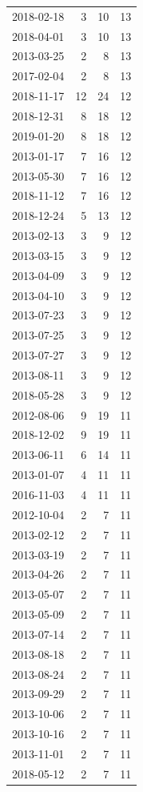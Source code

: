 \begin{tabular}{lrrr}
2018-02-18 & 3 & 10 & 13 \\
2018-04-01 & 3 & 10 & 13 \\
2013-03-25 & 2 & 8 & 13 \\
2017-02-04 & 2 & 8 & 13 \\
2018-11-17 & 12 & 24 & 12 \\
2018-12-31 & 8 & 18 & 12 \\
2019-01-20 & 8 & 18 & 12 \\
2013-01-17 & 7 & 16 & 12 \\
2013-05-30 & 7 & 16 & 12 \\
2018-11-12 & 7 & 16 & 12 \\
2018-12-24 & 5 & 13 & 12 \\
2013-02-13 & 3 & 9 & 12 \\
2013-03-15 & 3 & 9 & 12 \\
2013-04-09 & 3 & 9 & 12 \\
2013-04-10 & 3 & 9 & 12 \\
2013-07-23 & 3 & 9 & 12 \\
2013-07-25 & 3 & 9 & 12 \\
2013-07-27 & 3 & 9 & 12 \\
2013-08-11 & 3 & 9 & 12 \\
2018-05-28 & 3 & 9 & 12 \\
2012-08-06 & 9 & 19 & 11 \\
2018-12-02 & 9 & 19 & 11 \\
2013-06-11 & 6 & 14 & 11 \\
2013-01-07 & 4 & 11 & 11 \\
2016-11-03 & 4 & 11 & 11 \\
2012-10-04 & 2 & 7 & 11 \\
2013-02-12 & 2 & 7 & 11 \\
2013-03-19 & 2 & 7 & 11 \\
2013-04-26 & 2 & 7 & 11 \\
2013-05-07 & 2 & 7 & 11 \\
2013-05-09 & 2 & 7 & 11 \\
2013-07-14 & 2 & 7 & 11 \\
2013-08-18 & 2 & 7 & 11 \\
2013-08-24 & 2 & 7 & 11 \\
2013-09-29 & 2 & 7 & 11 \\
2013-10-06 & 2 & 7 & 11 \\
2013-10-16 & 2 & 7 & 11 \\
2013-11-01 & 2 & 7 & 11 \\
2018-05-12 & 2 & 7 & 11 \\

\end{tabular}

